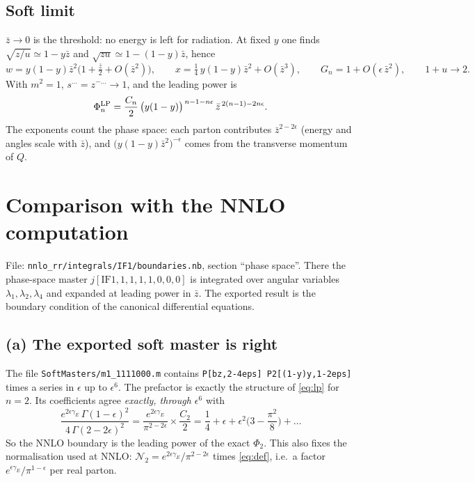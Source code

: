 \documentclass[11pt,a4paper]{article}
\newcommand{\ep}{\epsilon}
\newcommand{\zb}{\bar z}
\begin{document}
\subsection{Soft limit}
$\zb\to0$ is the threshold: no energy is left for radiation. At fixed $y$ one finds
$\sqrt{z/u}\simeq1-y\zb$ and $\sqrt{zu}\simeq1-(1-y)\zb$, hence
\[
  w=y(1-y)\zb^2\big(1+\tfrac{\zb}2+O(\zb^2)\big),\qquad x=\tfrac14\,y(1-y)\zb^2+O(\zb^3),\qquad
  G_n=1+O(\ep\,\zb^2),\qquad 1+u\to2 .
\]
With $m^2=1$, $s^{\dots}=z^{-\dots}\to1$, and the leading power is
\begin{equation}
  \Phi_n^{\rm LP}=\frac{C_n}{2}\,\big(y(1-y)\big)^{\,n-1-n\ep}\,\zb^{\,2(n-1)-2n\ep}.
  \label{eq:lp}
\end{equation}
The exponents count the phase space: each parton contributes $\zb^{2-2\ep}$ (energy and angles scale with $\zb$),
and $\big(y(1-y)\zb^2\big)^{-\ep}$ comes from the transverse momentum of $Q$.

\section{Comparison with the NNLO computation}
\label{sec:nnlo}
File: \texttt{nnlo\_rr/integrals/IF1/boundaries.nb}, section ``phase space''. There the phase-space master
$j[\mathrm{IF1},1,1,1,1,0,0,0]$ is integrated over angular variables $\lambda_1,\lambda_2,\lambda_4$ and expanded
at leading power in $\zb$. The exported result is the boundary condition of the canonical differential equations.

\subsection{(a) The exported soft master is right}
The file \texttt{SoftMasters/m1\_1111000.m} contains
\texttt{P[bz,2-4eps]\,P2[(1-y)y,1-2eps]} times a series in $\ep$ up to $\ep^6$. The prefactor is exactly the
structure of \eqref{eq:lp} for $n=2$. Its coefficients agree \emph{exactly, through $\ep^6$} with
\begin{equation}
  \frac{e^{2\ep\gamma_E}\,\Gamma(1-\ep)^2}{4\,\Gamma(2-2\ep)^2}
  =\frac{e^{2\ep\gamma_E}}{\pi^{2-2\ep}}\times\frac{C_2}{2}
  =\frac14+\ep+\ep^2\Big(3-\frac{\pi^2}8\Big)+\dots
\end{equation}
So the NNLO boundary is the leading power of the exact $\Phi_2$. This also fixes the normalisation used at NNLO:
$\mathcal N_2=e^{2\ep\gamma_E}/\pi^{2-2\ep}$ times \eqref{eq:def}, i.e.\ a factor $e^{\ep\gamma_E}/\pi^{1-\ep}$ per
real parton.
\end{document}
